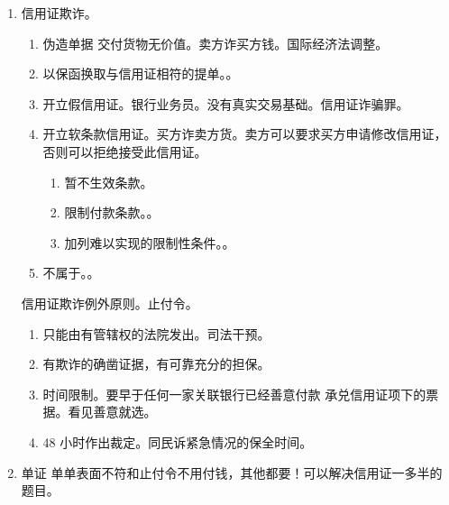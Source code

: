 \begin{enumerate}
\begin{enumerate}
          \item 一家银行开出的信用证，被另一家银行加以保证兑付。本质就是一个加持的信用证。
          \item 连带责任。
        \end{enumerate}
  \item 信用证欺诈。
        \begin{enumerate}
          \item 伪造单据 \hz 交付货物无价值。卖方诈买方钱。国际经济法调整。
          \item 以保函换取与信用证相符的提单。。
          \item 开立假信用证。银行业务员。没有真实交易基础。信用证诈骗罪。
          \item 开立软条款信用证。买方诈卖方货。卖方可以要求买方申请修改信用证，否则可以拒绝接受此信用证。
                \begin{enumerate}
                  \item 暂不生效条款。
                  \item 限制付款条款。。
                  \item 加列难以实现的限制性条件。。
                \end{enumerate}
          \item 不属于。。
        \end{enumerate}

        \begin{kk}{信用证欺诈例外原则。止付令。}
          \begin{enumerate}
            \item 只能由有管辖权的法院发出。司法干预。
            \item 有欺诈的确凿证据，有可靠充分的担保。
            \item 时间限制。要早于任何一家关联银行已经善意付款 \hz 承兑信用证项下的票据。看见善意就选。
            \item 48 小时作出裁定。同民诉紧急情况的保全时间。
          \end{enumerate}
        \end{kk}
  \item 单证 \hz 单单表面不符和止付令不用付钱，其他都要！可以解决信用证一多半的题目。
\end{enumerate}
